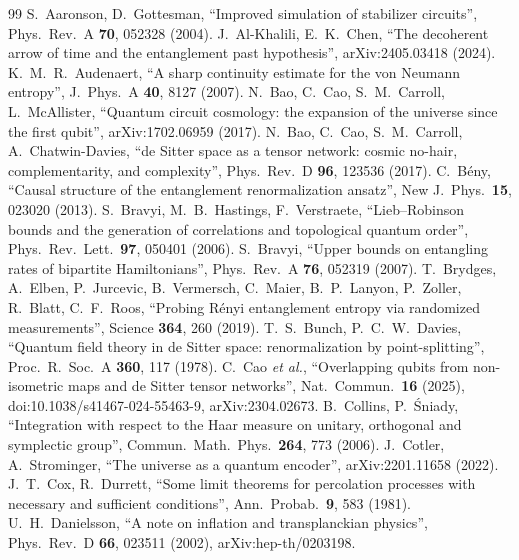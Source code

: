 \begin{thebibliography}{99}\small
{} S.~Aaronson, D.~Gottesman, ``Improved simulation of stabilizer circuits'', Phys.\ Rev.\ A \textbf{70}, 052328 (2004).
 J.~Al-Khalili, E.~K.~Chen, ``The decoherent arrow of time and the entanglement past hypothesis'', arXiv:2405.03418 (2024).
 K.~M.~R.~Audenaert, ``A sharp continuity estimate for the von Neumann entropy'', J.\ Phys.\ A \textbf{40}, 8127 (2007).
 N.~Bao, C.~Cao, S.~M.~Carroll, L.~McAllister, ``Quantum circuit cosmology: the expansion of the universe since the first qubit'', arXiv:1702.06959 (2017).
 N.~Bao, C.~Cao, S.~M.~Carroll, A.~Chatwin-Davies, ``de Sitter space as a tensor network: cosmic no-hair, complementarity, and complexity'', Phys.\ Rev.\ D \textbf{96}, 123536 (2017).
 C.~B\'eny, ``Causal structure of the entanglement renormalization ansatz'', New J.\ Phys.\ \textbf{15}, 023020 (2013).
 S.~Bravyi, M.~B.~Hastings, F.~Verstraete, ``Lieb--Robinson bounds and the generation of correlations and topological quantum order'', Phys.\ Rev.\ Lett.\ \textbf{97}, 050401 (2006).
 S.~Bravyi, ``Upper bounds on entangling rates of bipartite Hamiltonians'', Phys.\ Rev.\ A \textbf{76}, 052319 (2007).
 T.~Brydges, A.~Elben, P.~Jurcevic, B.~Vermersch, C.~Maier, B.~P.~Lanyon, P.~Zoller, R.~Blatt, C.~F.~Roos, ``Probing R\'enyi entanglement entropy via randomized measurements'', Science \textbf{364}, 260 (2019).
 T.~S.~Bunch, P.~C.~W.~Davies, ``Quantum field theory in de Sitter space: renormalization by point-splitting'', Proc.\ R.\ Soc.\ A \textbf{360}, 117 (1978).
 C.~Cao \emph{et al.}, ``Overlapping qubits from non-isometric maps and de Sitter tensor networks'', Nat.\ Commun.\ \textbf{16} (2025), doi:10.1038/s41467-024-55463-9, arXiv:2304.02673.
 B.~Collins, P.~\'Sniady, ``Integration with respect to the Haar measure on unitary, orthogonal and symplectic group'', Commun.\ Math.\ Phys.\ \textbf{264}, 773 (2006).
 J.~Cotler, A.~Strominger, ``The universe as a quantum encoder'', arXiv:2201.11658 (2022).
 J.~T.~Cox, R.~Durrett, ``Some limit theorems for percolation processes with necessary and sufficient conditions'', Ann.\ Probab.\ \textbf{9}, 583 (1981).
 U.~H.~Danielsson, ``A note on inflation and transplanckian physics'', Phys.\ Rev.\ D \textbf{66}, 023511 (2002), arXiv:hep-th/0203198.

\end{thebibliography}
